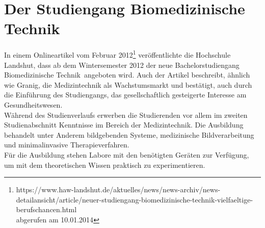 \section{Der Studiengang Biomedizinische Technik}\label{einleitung:biomedTechnik}
In einem Onlineartikel vom Februar 2012\footnote{https://www.haw-landshut.de/aktuelles/news/news-archiv/news-detailansicht/article/neuer-studiengang-biomedizinische-technik-vielfaeltige-berufschancen.html \\ abgerufen am 10.01.2014} veröffentlichte die Hochschule Landshut, dass ab dem Wintersemester 2012 der neue Bachelorstudiengang \glqq Biomedizinische Technik\grqq\ angeboten wird. Auch der Artikel beschreibt, ähnlich wie Granig, die Medizintechnik als Wachstumsmarkt und bestätigt, auch durch die Einführung des Studiengangs, das gesellschaftlich gesteigerte Interesse am Gesundheitswesen.\\
Während des Studienverlaufs \cite{hsla:modulBMT} erwerben die Studierenden vor allem im zweiten Studienabschnitt Kenntnisse im Bereich der Medizintechnik. Die Ausbildung behandelt unter Anderem bildgebenden Systeme, medizinische Bildverarbeitung und minimalinvasive Therapieverfahren.\\
Für die Ausbildung stehen Labore mit den benötigten Geräten zur Verfügung, um mit dem theoretischen Wissen praktisch zu experimentieren.

